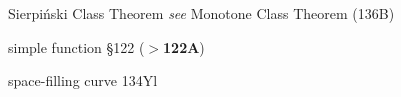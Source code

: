 Sierpi\'nski Class Theorem {\it see} Monotone Class Theorem (136B)














simple function \S122 ({\bf $\pmb{>}$122A})













































































space-filling curve 134Yl




























